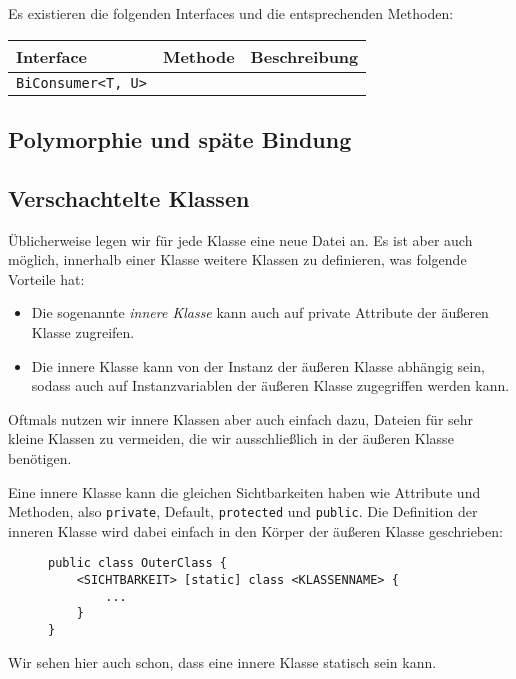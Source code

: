 			Es existieren die folgenden Interfaces und die entsprechenden Methoden:
			\begin{table}[H]
				\centering
				\begin{tabular}{l | l | l}
					\textbf{Interface} & \textbf{Methode} & \textbf{Beschreibung} \\ \hline
					\lstinline|BiConsumer<T, U>| & & \\
				\end{tabular}
			\end{table}

\subsection{Polymorphie und späte Bindung}
	

\subsection{Verschachtelte Klassen}
	\label{sec:classes_nested}
	
	Üblicherweise legen wir für jede Klasse eine neue Datei an. Es ist aber auch möglich, innerhalb einer Klasse weitere Klassen zu definieren, was folgende Vorteile hat:
	\begin{itemize}
		\item Die sogenannte \textit{innere Klasse} kann auch auf private Attribute der äußeren Klasse zugreifen.
		\item Die innere Klasse kann von der Instanz der äußeren Klasse abhängig sein, sodass auch auf Instanzvariablen der äußeren Klasse zugegriffen werden kann.
	\end{itemize}
	Oftmals nutzen wir innere Klassen aber auch einfach dazu, Dateien für sehr kleine Klassen zu vermeiden, die wir ausschließlich in der äußeren Klasse benötigen.
	
	Eine innere Klasse kann die gleichen Sichtbarkeiten haben wie Attribute und Methoden, also \lstinline|private|, Default, \lstinline|protected| und \lstinline|public|. Die Definition der inneren Klasse wird dabei einfach in den Körper der äußeren Klasse geschrieben:
	\begin{figure}[H]
		\centering
		\begin{lstlisting}
public class OuterClass {
	<SICHTBARKEIT> [static] class <KLASSENNAME> {
		...
	}
}
\end{lstlisting}
	\end{figure}
	Wir sehen hier auch schon, dass eine innere Klasse statisch sein kann.
	
